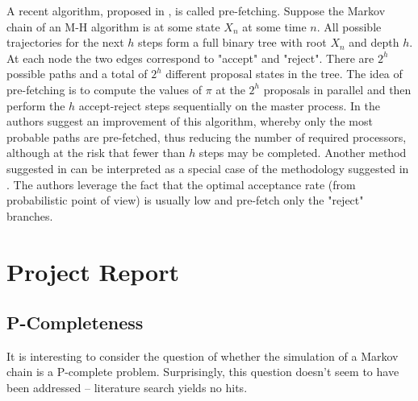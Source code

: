 \documentclass[11pt,letterpaper]{article}       %
\begin{document}
A recent algorithm, proposed in \cite{brockwell2006parallel}, is called 
pre-fetching.  Suppose the Markov chain of an M-H algorithm is at some state
$X_n$ at some time $n$.  All possible trajectories for the next $h$ steps 
form a full binary tree with root $X_n$ and depth $h$.  At each node 
the two edges correspond to "accept" and "reject".  
There are $2^h$ possible paths and a total of $2^h$ different 
proposal states in the tree.  The idea of pre-fetching is to compute the values of $\pi$
at the $2^h$ proposals in parallel and then perform the $h$ accept-reject 
steps sequentially on the master process.  In \cite{strid2010efficient} 
the authors suggest an improvement of this algorithm, whereby only the most probable 
paths are pre-fetched, thus reducing the number of required processors, although at
the risk that fewer than $h$ steps may be completed.  Another method suggested in 
\cite{byrd2008reducing} can be interpreted as a special case of the methodology 
suggested in \cite{strid2010efficient}.  The authors leverage the fact that the optimal 
acceptance rate (from probabilistic point of view) is usually low and pre-fetch 
only the "reject" branches.

\section{Project Report} \label{projrep}

\subsection{P-Completeness} \label{subsect-PComp}

It is interesting to consider the question of whether the simulation of a
Markov chain is a P-complete problem.  Surprisingly, this question doesn't seem
to have been addressed -- literature search yields no hits.
\end{document}
